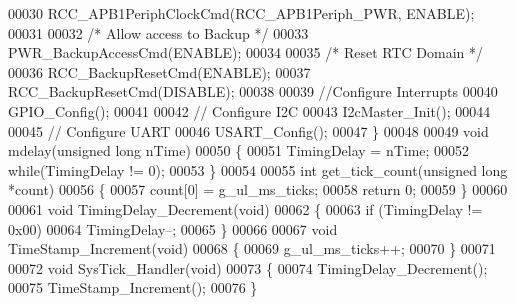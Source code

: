 \begin{DoxyCode}
00030     RCC_APB1PeriphClockCmd(RCC_APB1Periph_PWR, ENABLE);
00031 
00032     \textcolor{comment}{/* Allow access to Backup */}
00033     PWR_BackupAccessCmd(ENABLE);
00034 
00035     \textcolor{comment}{/* Reset RTC Domain */}
00036     RCC_BackupResetCmd(ENABLE);
00037     RCC_BackupResetCmd(DISABLE);
00038 
00039     \textcolor{comment}{//Configure Interrupts}
00040     GPIO_Config();
00041 
00042     \textcolor{comment}{// Configure I2C}
00043     I2cMaster_Init();
00044 
00045     \textcolor{comment}{// Configure UART}
00046     USART_Config();
00047 \}
00048 
00049 \textcolor{keywordtype}{void} mdelay(\textcolor{keywordtype}{unsigned} \textcolor{keywordtype}{long} nTime)
00050 \{
00051     TimingDelay = nTime;
00052     \textcolor{keywordflow}{while}(TimingDelay != 0);
00053 \}
00054 
00055 \textcolor{keywordtype}{int} get_tick_count(\textcolor{keywordtype}{unsigned} \textcolor{keywordtype}{long} *count)
00056 \{
00057         count[0] = g_ul_ms_ticks;
00058     \textcolor{keywordflow}{return} 0;
00059 \}
00060 
00061 \textcolor{keywordtype}{void} TimingDelay_Decrement(\textcolor{keywordtype}{void})
00062 \{
00063     \textcolor{keywordflow}{if} (TimingDelay != 0x00)
00064         TimingDelay--;
00065 \}
00066 
00067 \textcolor{keywordtype}{void} TimeStamp_Increment(\textcolor{keywordtype}{void})
00068 \{
00069     g_ul_ms_ticks++;
00070 \}
00071 
00072 \textcolor{keywordtype}{void} SysTick_Handler(\textcolor{keywordtype}{void})
00073 \{
00074     TimingDelay_Decrement();
00075     TimeStamp_Increment();
00076 \}
\end{DoxyCode}
